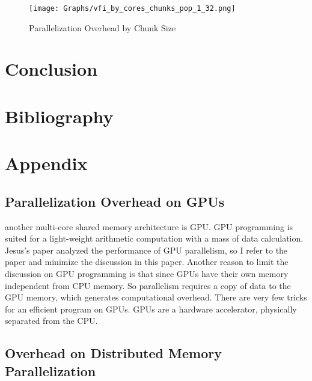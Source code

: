 \documentclass[12pt]{article}
\begin{document}
\begin{figure}[t!]
\sf
\begin{center}
\caption{\sf Parallelization Overhead by Chunk Size}
\texttt{[image: Graphs/vfi\_by\_cores\_chunks\_pop\_1\_32.png]}\label{fig:po_chunk}
\end{center}
\end{figure}


\section{Conclusion}



\clearpage
\section{Bibliography}
%





\clearpage
\section{Appendix}



\subsection{Parallelization Overhead on GPUs}
another multi-core shared memory architecture is GPU. GPU programming is suited for a light-weight arithmetic computation with a mass of data calculation.
Jesus's paper analyzed the performance of GPU parallelism, so I refer to the paper and minimize the discussion in this paper.
Another reason to limit the discussion on GPU programming is that since GPUs have their own memory independent from CPU memory. So parallelism requires a copy of data to the GPU memory, which generates computational overhead. There are very few tricks for an efficient program on GPUs.
GPUs are a hardware accelerator, physically separated from the CPU.


\subsection{Overhead on Distributed Memory Parallelization}
\end{document}
